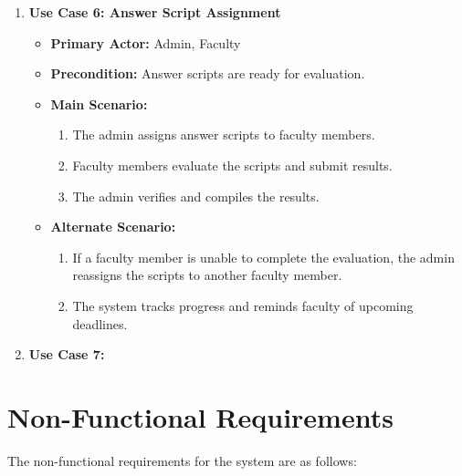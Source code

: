 \documentclass{scrreprt}
\begin{document}
\begin{enumerate}
    \item \textbf{Use Case 6: Answer Script Assignment}
    \begin{itemize}
        \item \textbf{Primary Actor:} Admin, Faculty
        \item \textbf{Precondition:} Answer scripts are ready for evaluation.
        \item \textbf{Main Scenario:}
        \begin{enumerate}
            \item The admin assigns answer scripts to faculty members.
            \item Faculty members evaluate the scripts and submit results.
            \item The admin verifies and compiles the results.
        \end{enumerate}
        \item \textbf{Alternate Scenario:}
        \begin{enumerate}
            \item If a faculty member is unable to complete the evaluation, the admin reassigns the scripts to another faculty member.
            \item The system tracks progress and reminds faculty of upcoming deadlines.
        \end{enumerate}
    \end{itemize}

    \item \textbf{Use Case 7: }
\end{enumerate}

\section{Non-Functional Requirements}

The non-functional requirements for the system are as follows:
\end{document}
